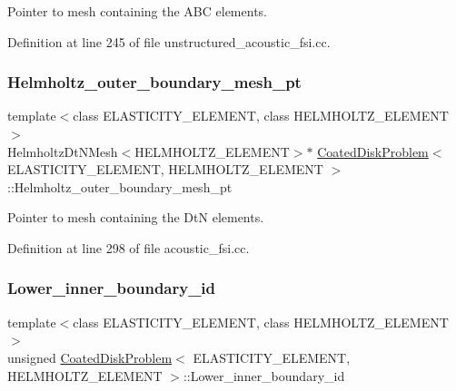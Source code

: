 Pointer to mesh containing the A\+BC elements. 



Definition at line 245 of file unstructured\+\_\+acoustic\+\_\+fsi.\+cc.

\mbox{\label{classCoatedDiskProblem_a142852ffdecdb2f76acf3e4c11ce4b04}} 
\subsubsection{\texorpdfstring{Helmholtz\+\_\+outer\+\_\+boundary\+\_\+mesh\+\_\+pt}{Helmholtz\_outer\_boundary\_mesh\_pt}\hspace{0.1cm}{\footnotesize\ttfamily [2/2]}}
{\footnotesize\ttfamily template$<$class E\+L\+A\+S\+T\+I\+C\+I\+T\+Y\+\_\+\+E\+L\+E\+M\+E\+NT, class H\+E\+L\+M\+H\+O\+L\+T\+Z\+\_\+\+E\+L\+E\+M\+E\+NT$>$ \\
Helmholtz\+Dt\+N\+Mesh$<$H\+E\+L\+M\+H\+O\+L\+T\+Z\+\_\+\+E\+L\+E\+M\+E\+NT$>$$\ast$ \hyperlink{classCoatedDiskProblem}{Coated\+Disk\+Problem}$<$ E\+L\+A\+S\+T\+I\+C\+I\+T\+Y\+\_\+\+E\+L\+E\+M\+E\+NT, H\+E\+L\+M\+H\+O\+L\+T\+Z\+\_\+\+E\+L\+E\+M\+E\+NT $>$\+::Helmholtz\+\_\+outer\+\_\+boundary\+\_\+mesh\+\_\+pt\hspace{0.3cm}{\ttfamily [private]}}



Pointer to mesh containing the DtN elements. 



Definition at line 298 of file acoustic\+\_\+fsi.\+cc.

\mbox{\label{classCoatedDiskProblem_a693be7a3e4c968c52d5c19d9a35a05b3}} 
\subsubsection{\texorpdfstring{Lower\+\_\+inner\+\_\+boundary\+\_\+id}{Lower\_inner\_boundary\_id}}
{\footnotesize\ttfamily template$<$class E\+L\+A\+S\+T\+I\+C\+I\+T\+Y\+\_\+\+E\+L\+E\+M\+E\+NT, class H\+E\+L\+M\+H\+O\+L\+T\+Z\+\_\+\+E\+L\+E\+M\+E\+NT$>$ \\
unsigned \hyperlink{classCoatedDiskProblem}{Coated\+Disk\+Problem}$<$ E\+L\+A\+S\+T\+I\+C\+I\+T\+Y\+\_\+\+E\+L\+E\+M\+E\+NT, H\+E\+L\+M\+H\+O\+L\+T\+Z\+\_\+\+E\+L\+E\+M\+E\+NT $>$\+::Lower\+\_\+inner\+\_\+boundary\+\_\+id\hspace{0.3cm}{\ttfamily [private]}}



